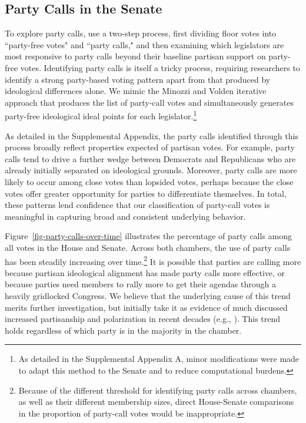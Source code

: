 \documentclass[12pt]{article}
\begin{document}
\subsection*{Party Calls in the Senate}

To explore party calls, \cite{Minozzi:2013} use a two-step process, first dividing floor votes into ``party-free votes" and ``party calls," and then examining which legislators are most responsive to party calls beyond their baseline partisan support on party-free votes. Identifying party calls is itself a tricky process, requiring researchers to identify a strong party-based voting pattern apart from that produced by ideological differences alone. We mimic the Minozzi and Volden iterative approach that produces the list of party-call votes and simultaneously generates party-free ideological ideal points for each legislator.\footnote{\doublespacing\normalsize As detailed in the Supplemental Appendix A, minor modifications were made to adapt this method to the Senate and to reduce computational burdens.}

As detailed in the Supplemental Appendix, the party calls identified through this process broadly reflect properties expected of partisan votes. For example, party calls tend to drive a further wedge between Democrats and Republicans who are already initially separated on ideological grounds. Moreover, party calls are more likely to occur among close votes than lopsided votes, perhaps because the close votes offer greater opportunity for parties to differentiate themselves.  In total, these patterns lend confidence that our classification of party-call votes is meaningful in capturing broad and consistent underlying behavior.

Figure~\ref{fig-party-calls-over-time} illustrates the percentage of party calls among all votes in the House and Senate. Across both chambers, the use of party calls has been steadily increasing over time.\footnote{\doublespacing\normalsize Because of the different threshold for identifying party calls across chambers, as well as their different membership sizes, direct House-Senate comparisons in the proportion of party-call votes would be inappropriate.} It is possible that parties are calling more because partisan ideological alignment has made party calls more effective, or because parties need members to rally more to get their agendas through a heavily gridlocked Congress. We believe that the underlying cause of this trend merits further investigation, but initially take it as evidence of much discussed increased partisanship and polarization in recent decades (e.g.,  \cite{Aldrich:2000, Lee:2009, Lee:2016, Theriault:2013, Smith:2014}). This trend holds regardless of which party is in the majority in the chamber.
\end{document}
